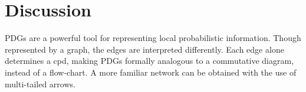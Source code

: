 \documentclass{article}
\theoremstyle{plain}
\theoremstyle{definition}
\theoremstyle{remark}
\newcommand{\commentout}[1]{\ignorespaces}
\numberwithin{equation}{section}
\begin{document}
	\section{Discussion}
\commentout{
	Given more computation, would your beliefs be more consistent? Or would you explore further, forming more extensive networks of them?
	The canonical picture of an idealized agent has always given the first answer, but this may not necessarily be the case.
}
 

	PDGs are a powerful tool for representing local probabilistic information.
	Though represented by a graph, the edges are interpreted differently. Each edge alone determines a cpd, making PDGs formally analogous to a commutative diagram, instead of a flow-chart. A more familiar network can be obtained with the use of multi-tailed arrows.
\end{document}
